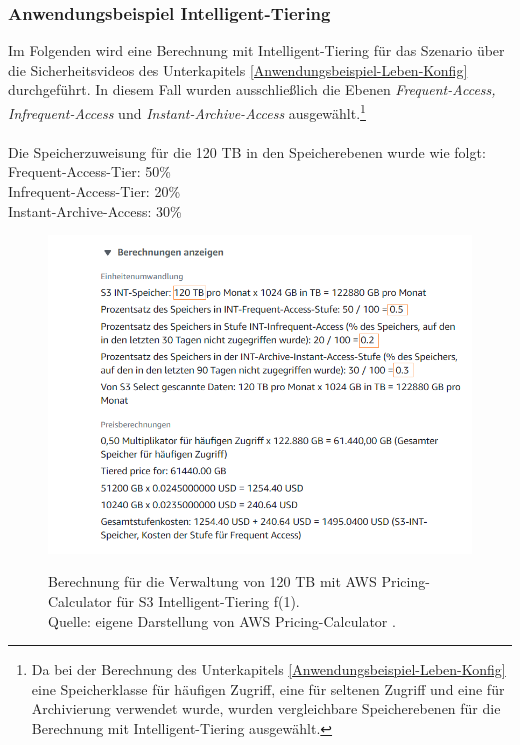 \subsubsection*{Anwendungsbeispiel Intelligent-Tiering} 
Im Folgenden wird eine Berechnung mit Intelligent-Tiering für das Szenario über die Sicherheitsvideos des Unterkapitels \ref{Anwendungsbeispiel-Leben-Konfig} durchgeführt. In diesem Fall wurden ausschließlich die Ebenen \textit{Frequent-Access, Infrequent-Access} und \textit{Instant-Archive-Access} ausgewählt.\footnote{Da bei der Berechnung des Unterkapitels \ref{Anwendungsbeispiel-Leben-Konfig} eine Speicherklasse für häufigen Zugriff, eine für seltenen Zugriff und eine für Archivierung verwendet wurde, wurden vergleichbare Speicherebenen für die Berechnung mit Intelligent-Tiering ausgewählt.} %
\\\\
Die Speicherzuweisung für die 120 TB in den Speicherebenen wurde wie folgt:\\
Frequent-Access-Tier: 50\% \\
Infrequent-Access-Tier: 20\%\\
Instant-Archive-Access: 30\%
\\
\begin{figure}[h!]
  \centering
  \includegraphics[scale=0.6]{sources/S3_INT_1}
  \caption[Berechnung für die Verwaltung von 120 TB mit AWS Pricing-Calculator für S3 Intelligent-Tiering (1)]{}
  \label{fig:INT_S3_1} Berechnung für die Verwaltung von 120 TB mit AWS Pricing-Calculator für S3 Intelligent-Tiering f(1).\\
  Quelle: eigene Darstellung von AWS Pricing-Calculator \cite{AMZ17-S3}.
\end{figure}
